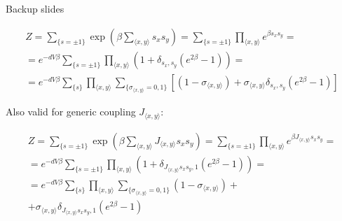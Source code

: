 \documentclass[12pt,handout]{beamer}
\begin{document}
\begin{frame}{Backup slides}
\begin{center}

\begin{gather*}
Z = \sum_{\lbrace s = \pm 1\rbrace} \exp \left( \beta \sum_{\langle x, y \rangle} s_x s_y \right) = \sum_{\lbrace s = \pm 1 \rbrace} \prod_{\langle x, y \rangle} e^{ \beta  s_x s_y} = \\[20pt]
= e ^{ -d V \beta } \sum_{\lbrace s = \pm 1 \rbrace} \prod_{\langle x, y \rangle} \left( 1 + \delta_{s_x, s_y} \left( e^{  2 \beta} - 1 \right) \right) = \\[20pt]
= e^{ -d V \beta} \sum_{\lbrace s \rbrace} \prod_{\langle x, y \rangle}   \sum_{\lbrace \sigma_{\langle x, y \rangle} = 0,1 \rbrace} \left[ \left( 1 - \sigma_{\langle x, y \rangle} \right)
+ \sigma_{\langle x, y \rangle} \delta_{s_x, s_y} \left( e^{ 2 \beta } - 1 \right) \right]
\end{gather*}

\end{center}
\end{frame}

\begin{frame}
\begin{center}

Also valid for generic coupling $J_{\langle x, y \rangle}$:

\begin{gather*}
Z = \sum_{\lbrace s = \pm 1\rbrace} \exp \left( \beta \sum_{\langle x, y \rangle} J_{\langle x, y \rangle} s_x s_y \right) = \sum_{\lbrace s = \pm 1 \rbrace} \prod_{\langle x, y \rangle} e^{ \beta  J_{\langle x, y \rangle} s_x s_y} = \\[20pt]
= e ^{ -d V \beta } \sum_{\lbrace s = \pm 1 \rbrace} \prod_{\langle x, y \rangle} \left( 1 + \delta_{J_{\langle x, y \rangle} s_x s_y, 1} \left( e^{  2 \beta} - 1 \right) \right) = \\[20pt]
= e^{ -d V \beta} \sum_{\lbrace s \rbrace} \prod_{\langle x, y \rangle}   \sum_{\lbrace \sigma_{\langle x, y \rangle} = 0,1 \rbrace}  \left( 1 - \sigma_{\langle x, y \rangle} \right) + \\
+ \sigma_{\langle x, y \rangle} \delta_{J_{\langle x, y \rangle} s_x s_y, 1} \left( e^{ 2 \beta } - 1 \right) 
\end{gather*}

\end{center}
\end{frame}
\end{document}
